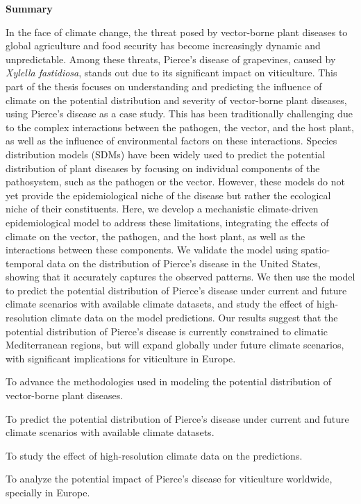 \thispagestyle{empty}

\begin{center}
    \textbf{\Large Summary}
\end{center}

In the face of climate change, the threat posed by vector-borne plant diseases
to global agriculture and food security has become increasingly dynamic and
unpredictable. Among these threats, Pierce's disease of grapevines, caused by
\textit{Xylella fastidiosa}, stands out due to its significant impact on
viticulture. This part of the thesis focuses on understanding and predicting
the influence of climate on the potential distribution and severity of
vector-borne plant diseases, using Pierce's disease as a case study. This has
been traditionally challenging due to the complex interactions between the
pathogen, the vector, and the host plant, as well as the influence of
environmental factors on these interactions. Species distribution models (SDMs)
have been widely used to predict the potential distribution of plant
diseases by focusing on individual components of the pathosystem, such as the
pathogen or the vector. However, these models do not yet provide the
epidemiological niche of the disease but rather the ecological niche of their
constituents. Here, we develop a mechanistic climate-driven
epidemiological model to address these limitations, integrating the effects of
climate on the vector, the pathogen, and the host plant, as well as the
interactions between these components. We validate the model using
spatio-temporal data on the distribution of Pierce's disease in the United
States, showing that it accurately captures the observed patterns. We then use
the model to predict the potential distribution of Pierce's disease under
current and future climate scenarios with available climate datasets, and
study the effect of high-resolution climate data on the model predictions. Our
results suggest that the potential distribution of Pierce's disease is
currently constrained to climatic Mediterranean regions, but  will expand
globally under future climate scenarios, with significant implications
for viticulture in Europe.

\vspace{1cm}

\begin{objectiveslist}
    \item To advance the methodologies used in modeling the potential
    distribution of vector-borne plant diseases.

    \item To predict the potential distribution of Pierce's disease under
    current and future climate scenarios with available climate datasets.

    \item To study the effect of high-resolution climate data on the
    predictions.

    \item To analyze the potential impact of Pierce's disease for viticulture
    worldwide, specially in Europe.
\end{objectiveslist}

